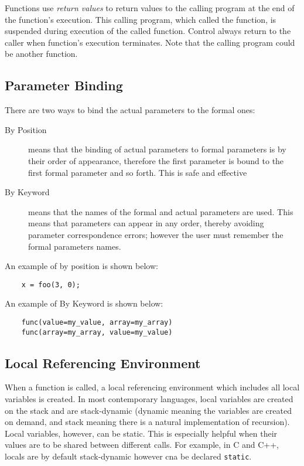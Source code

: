 Functions use \textit{return values} to return values to the calling program at the end of the function's execution. This calling program, which called the function, is suspended during execution of the called function. Control always return to the caller when function's execution terminates. Note that the calling program could be another function. 

\subsection{Parameter Binding}
There are two ways to bind the actual parameters to the formal ones:
\begin{description}
    \item[By Position] means that the binding of actual parameters to formal parameters is by their order of appearance, therefore the first parameter is bound to the first formal parameter and so forth.  This is safe and effective
    \item[By Keyword] means that the names of the formal and actual parameters are used. This means that parameters can appear in any order, thereby avoiding parameter correspondence errors; however the user must remember the formal parameters names.
\end{description}

An example of by position is shown below:
\begin{verbatim}
    x = foo(3, 0);
\end{verbatim}
An example of By Keyword is shown below:
\begin{verbatim}
    func(value=my_value, array=my_array)
    func(array=my_array, value=my_value)
\end{verbatim}

\subsection{Local Referencing Environment}
When a function is called, a local referencing environment which includes all local variables is created. In most contemporary languages, local variables are created on the stack and are stack-dynamic (dynamic meaning the variables are created on demand, and stack meaning there is a natural implementation of recursion).\\

Local variables, however, can be static. This is especially helpful when their values are to be shared between different calls. For example, in C and C++, locals are by default stack-dynamic however cna be declared \verb|static|. 

